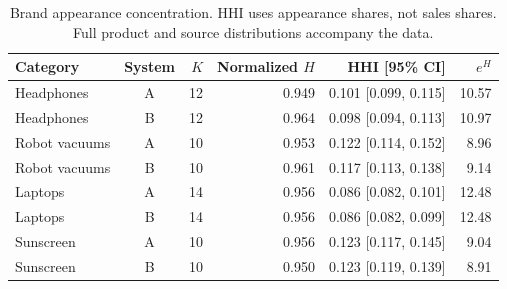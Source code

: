 \begin{table}[H]
\caption{Brand appearance concentration. HHI uses appearance shares, not sales shares. Full product and source distributions accompany the data.}\label{tab:concentration}
\small
\begin{tabularx}{\textwidth}{Y c r r r r}
\toprule
Category & System & $K$ & Normalized $H$ & HHI [95\% CI] & $e^H$ \\
\midrule
Headphones & A & 12 & 0.949 & 0.101 [0.099, 0.115] & 10.57 \\
Headphones & B & 12 & 0.964 & 0.098 [0.094, 0.113] & 10.97 \\
Robot vacuums & A & 10 & 0.953 & 0.122 [0.114, 0.152] & 8.96 \\
Robot vacuums & B & 10 & 0.961 & 0.117 [0.113, 0.138] & 9.14 \\
Laptops & A & 14 & 0.956 & 0.086 [0.082, 0.101] & 12.48 \\
Laptops & B & 14 & 0.956 & 0.086 [0.082, 0.099] & 12.48 \\
Sunscreen & A & 10 & 0.956 & 0.123 [0.117, 0.145] & 9.04 \\
Sunscreen & B & 10 & 0.950 & 0.123 [0.119, 0.139] & 8.91 \\
\bottomrule
\end{tabularx}
\end{table}